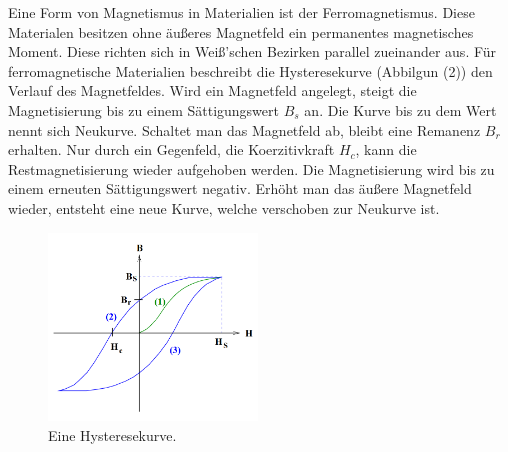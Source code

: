 \noindent Eine Form von Magnetismus in Materialien ist der Ferromagnetismus. Diese Materialen besitzen ohne äußeres Magnetfeld ein permanentes magnetisches Moment. 
Diese richten sich in Weiß'schen Bezirken parallel zueinander aus.
Für ferromagnetische Materialien beschreibt die Hysteresekurve (Abbilgun (2)) den Verlauf des Magnetfeldes.
Wird ein Magnetfeld angelegt, steigt die Magnetisierung bis zu einem Sättigungswert $B_s$ an. Die Kurve bis zu dem Wert nennt sich Neukurve.
Schaltet man das Magnetfeld ab, bleibt eine Remanenz $B_r$ erhalten. Nur durch ein Gegenfeld, die Koerzitivkraft $H_c$, kann die Restmagnetisierung wieder aufgehoben werden.
Die Magnetisierung wird bis zu einem erneuten Sättigungswert negativ. Erhöht man das äußere Magnetfeld wieder, entsteht eine neue Kurve, welche verschoben zur Neukurve ist.
\begin{figure}[H]
  \centering
  \includegraphics[height=5cm]{hysterese.png}
  \caption{Eine Hysteresekurve. \cite[S. 3]{sample}}
\end{figure}